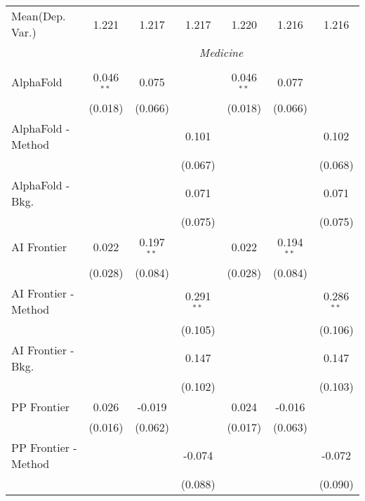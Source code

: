 \begin{tabular}{lcccccc}
Mean(Dep. Var.) & 1.221 & 1.217 & 1.217 & 1.220 & 1.216 & 1.216 \\
 & \multicolumn{6}{c}{\textit{Medicine}} \\ \\
   AlphaFold            & 0.046$^{**}$ & 0.075        &              & 0.046$^{**}$ & 0.077        &   \\   
                        & (0.018)      & (0.066)      &              & (0.018)      & (0.066)      &   \\   
   AlphaFold - Method   &              &              & 0.101        &              &              & 0.102\\   
                        &              &              & (0.067)      &              &              & (0.068)\\   
   AlphaFold - Bkg.     &              &              & 0.071        &              &              & 0.071\\   
                        &              &              & (0.075)      &              &              & (0.075)\\   
   AI Frontier          & 0.022        & 0.197$^{**}$ &              & 0.022        & 0.194$^{**}$ &   \\   
                        & (0.028)      & (0.084)      &              & (0.028)      & (0.084)      &   \\   
   AI Frontier - Method &              &              & 0.291$^{**}$ &              &              & 0.286$^{**}$\\   
                        &              &              & (0.105)      &              &              & (0.106)\\   
   AI Frontier - Bkg.   &              &              & 0.147        &              &              & 0.147\\   
                        &              &              & (0.102)      &              &              & (0.103)\\   
   PP Frontier          & 0.026        & -0.019       &              & 0.024        & -0.016       &   \\   
                        & (0.016)      & (0.062)      &              & (0.017)      & (0.063)      &   \\   
   PP Frontier - Method &              &              & -0.074       &              &              & -0.072\\   
                        &              &              & (0.088)      &              &              & (0.090)\\   

\end{tabular}

